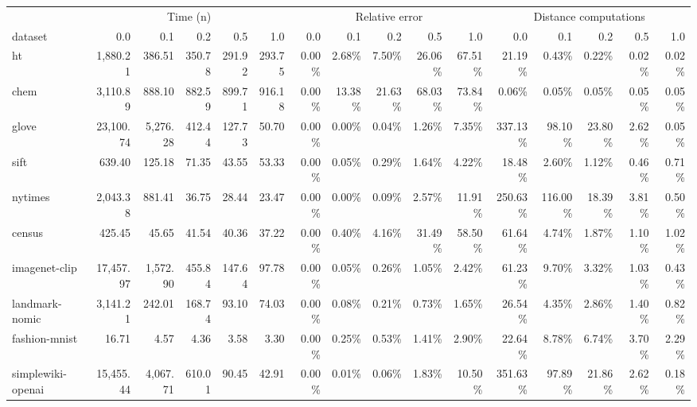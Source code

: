 \begin{table}[!t]


\fontsize{12.0pt}{14.4pt}\selectfont

\begin{tabular*}{\linewidth}{@{\extracolsep{\fill}}lrrrrrrrrrrrrrrr}
\toprule
 & \multicolumn{5}{c}{Time (n)} & \multicolumn{5}{c}{Relative error} & \multicolumn{5}{c}{Distance computations} \\ 
\cmidrule(lr){2-6} \cmidrule(lr){7-11} \cmidrule(lr){12-16}
dataset & 0.0 & 0.1 & 0.2 & 0.5 & 1.0 & 0.0 & 0.1 & 0.2 & 0.5 & 1.0 & 0.0 & 0.1 & 0.2 & 0.5 & 1.0 \\ 
\midrule\addlinespace[2.5pt]
ht & 1,880.21 & 386.51 & 350.78 & 291.92 & 293.75 & 0.00\% & 2.68\% & 7.50\% & 26.06\% & 67.51\% & 21.19\% & 0.43\% & 0.22\% & 0.02\% & 0.02\% \\
chem & 3,110.89 & 888.10 & 882.59 & 899.71 & 916.18 & 0.00\% & 13.38\% & 21.63\% & 68.03\% & 73.84\% & 0.06\% & 0.05\% & 0.05\% & 0.05\% & 0.05\% \\
glove & 23,100.74 & 5,276.28 & 412.44 & 127.73 & 50.70 & 0.00\% & 0.00\% & 0.04\% & 1.26\% & 7.35\% & 337.13\% & 98.10\% & 23.80\% & 2.62\% & 0.05\% \\
sift & 639.40 & 125.18 & 71.35 & 43.55 & 53.33 & 0.00\% & 0.05\% & 0.29\% & 1.64\% & 4.22\% & 18.48\% & 2.60\% & 1.12\% & 0.46\% & 0.71\% \\
nytimes & 2,043.38 & 881.41 & 36.75 & 28.44 & 23.47 & 0.00\% & 0.00\% & 0.09\% & 2.57\% & 11.91\% & 250.63\% & 116.00\% & 18.39\% & 3.81\% & 0.50\% \\
census & 425.45 & 45.65 & 41.54 & 40.36 & 37.22 & 0.00\% & 0.40\% & 4.16\% & 31.49\% & 58.50\% & 61.64\% & 4.74\% & 1.87\% & 1.10\% & 1.02\% \\
imagenet-clip & 17,457.97 & 1,572.90 & 455.84 & 147.64 & 97.78 & 0.00\% & 0.05\% & 0.26\% & 1.05\% & 2.42\% & 61.23\% & 9.70\% & 3.32\% & 1.03\% & 0.43\% \\
landmark-nomic & 3,141.21 & 242.01 & 168.74 & 93.10 & 74.03 & 0.00\% & 0.08\% & 0.21\% & 0.73\% & 1.65\% & 26.54\% & 4.35\% & 2.86\% & 1.40\% & 0.82\% \\
fashion-mnist & 16.71 & 4.57 & 4.36 & 3.58 & 3.30 & 0.00\% & 0.25\% & 0.53\% & 1.41\% & 2.90\% & 22.64\% & 8.78\% & 6.74\% & 3.70\% & 2.29\% \\
simplewiki-openai & 15,455.44 & 4,067.71 & 610.01 & 90.45 & 42.91 & 0.00\% & 0.01\% & 0.06\% & 1.83\% & 10.50\% & 351.63\% & 97.89\% & 21.86\% & 2.62\% & 0.18\% \\
\bottomrule
\end{tabular*}

\end{table}

